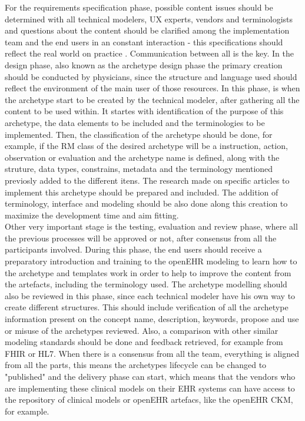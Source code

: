 \documentclass[mim_thesis.tex]{subfiles}
\begin{document}
For the requirements specification phase, possible content issues should be determined with all technical modelers, \ac{UX} experts, vendors and terminologists and questions about the content should be clarified among the implementation team and the end users in an constant interaction - this specifications should reflect the real world on practice \citep{hovenga2013health}. Communication between all is the key. In the design phase, also known as the archetype design phase \citep{Madsen2010} the primary creation should be conducted by physicians, since the structure and language used should reflect the environment of the main user of those resources. In this phase, is when the archetype start to be created by the technical modeler, after gathering all the content to be used within. It startes with identification of the purpose of this archetype, the data elements to be included and the terminologies to be implemented. Then, the classification of the archetype should be done, for example, if the RM class of the desired archetype will be a instruction, action, observation or evaluation and the archetype name is defined, along with the struture, data types, constrains, metadata and the terminology mentioned previosly added to the different itens. The research made on specific articles to implement this archetype should be prepared and included. The addition of terminology, interface and modeling should be also done along this creation to maximize the development time and aim fitting. \\

Other very important stage is the testing, evaluation and review phase, where all the previous processes will be approved or not, after consensus from all the participants involved. During this phase, the end users should receive a preparatory introduction and training to the openEHR modeling to learn how to the archetype and templates work in order to help to improve the content from the artefacts, including the terminology used. The archetype modelling should also be reviewed in this phase, since each technical modeler have his own way to create different structures. This should include verification of all the archetype information present on the concept name, description, keywords, propose and use or misuse of the archetypes reviewed. Also, a comparison with other similar modeling standards should be done and feedback retrieved, for example from FHIR or HL7. When there is a consensus from all the team, everything is aligned from all the parts, this means the archetypes lifecycle can be changed to "published" and the delivery phase can start, which means that the vendors who are implementing these clinical models on their EHR systems can have access to the repository of clinical models or openEHR artefacs, like the openEHR CKM, for example. 
\end{document}
